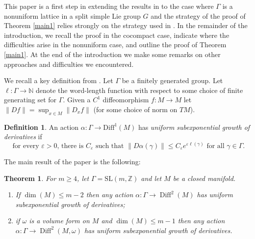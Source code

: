 \documentclass[10pt,reqno]{amsart}
\theoremstyle{Theorem}
\newtheorem{custheorem}{Theorem}
\theoremstyle{definition}
\newtheorem{definition}[theorem]{Definition}
\theoremstyle{remark}
\newcommand{\note}[1]{\marginpar{{\color{red}\footnotesize \begin{spacing}{1}#1\end{spacing}}}}
\newcommand{\diff}{\mathrm{Diff}}
\renewcommand{\epsilon}{\varepsilon}
\DeclareMathOperator{\Diff}{Diff}
\newcommand{\Z}{\mathbb {Z}}
\newcommand{\N}{\mathbb {N}}
\newcommand{\e}{\epsilon}
\newcommand{\Sl}{\mathrm{SL}}
\begin{document}
This paper is a first step in extending the results in \cite{BFH} to the case where $\Gamma$ is a nonuniform lattice in a split simple Lie group $G$ and the strategy of the proof of Theorem \ref{main1} relies strongly on the strategy used in \cite{BFH}.  In the remainder of the introduction, we recall the proof in the cocompact case, indicate where the difficulties arise in the nonuniform case, and outline the proof of Theorem \ref{main1}.  At the end of the introduction we make some remarks on other approaches and difficulties we encountered.  %


 We recall a   key definition from \cite{BFH}.
Let $\Gamma$ be a finitely generated group.  Let $\ell\colon \Gamma \to \N$ denote the word-length function with respect to some choice of finite generating set for $\Gamma$.  Given a $C^1$ diffeomorphism $f\colon M\to M$ let $\|Df \| = \sup_{x \in M} \|D_xf \|$ (for some choice of norm on $TM$).
\begin{definition}
An action $\alpha\colon \Gamma\to \diff^1(M)$   has \emph{uniform subexponential growth of derivatives} if
\begin{equation}\label{eq:USEGOD}\text{   for every $\e>0$, there is $C_{\e}$ such  that  $\|D\alpha(\gamma)\| \leq C_{\e}e^{\e \ell(\gamma)}$ for all $\gamma\in \Gamma.$}\end{equation}
\end{definition}

The  main result of the paper is the following: %
 \begin{custheorem}\label{main2} For {$m\ge 4$}, let $\Gamma= \Sl(m,\Z)$ and let $M$ be a closed manifold.
 \begin{enumerate}
 \item If  $\dim(M) \leq m - 2$ then any action  $\alpha\colon  \Gamma \to \Diff^2(M)$ has {uniform subexponential growth of derivatives};
 \item  if $\omega$ is a volume form on $M$ and $\dim(M) \leq m-1$ then any action  $\alpha\colon \Gamma \to \Diff^2(M, \omega)$ has {uniform subexponential growth of derivatives}.
 \end{enumerate}
\end{custheorem}
\end{document}
